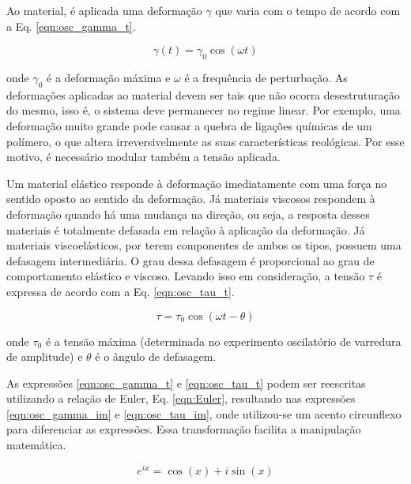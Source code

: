 			Ao material, é aplicada uma deformação \(\gamma\) que varia com o tempo de acordo com a Eq. \ref{eqn:osc_gamma_t}.
			
			\begin{equation}
				\gamma(t)=\gamma_0\cos(\omega t)
				\label{eqn:osc_gamma_t}
			\end{equation}
			
			\noindent onde \(\gamma_0\) é a deformação máxima e \(\omega\) é a frequência de perturbação. As deformações aplicadas ao material devem ser tais que não ocorra desestruturação do mesmo, isso é, o sistema deve permanecer no regime linear. Por exemplo, uma deformação muito grande pode causar a quebra de ligações químicas de um polímero, o que altera irreversivelmente as suas características reológicas. Por esse motivo, é necessário modular também a tensão aplicada.
			
			Um material elástico responde à deformação imediatamente com uma força no sentido oposto ao sentido da deformação. Já materiais viscosos respondem à deformação quando há uma mudança na direção, ou seja, a resposta desses materiais é totalmente defasada em relação à aplicação da deformação. Já materiais viscoelásticos, por terem componentes de ambos os tipos, possuem uma defasagem intermediária. O grau dessa defasagem é proporcional ao grau de comportamento elástico e viscoso. Levando isso em consideração, a tensão \(\tau\)  é expressa de acordo com a Eq. \ref{eqn:osc_tau_t}.
			
			\begin{equation}
				\tau = \tau_0\cos(\omega t - \theta)
				\label{eqn:osc_tau_t}
			\end{equation} 
			
			\noindent onde \(\tau_0\) é a tensão máxima (determinada no experimento oscilatório de varredura de amplitude) e \(\theta\) é o ângulo de defasagem.
			
			As expressões \ref{eqn:osc_gamma_t} e \ref{eqn:osc_tau_t} podem ser reescritas utilizando a relação de Euler, Eq. \ref{eqn:Euler}, resultando nas expressões \ref{eqn:osc_gamma_im} e \ref{eqn:osc_tau_im}, onde utilizou-se um acento circunflexo para diferenciar as expressões. Essa transformação facilita a manipulação matemática.
			
			\begin{equation}
				e^{ix} = \cos(x) + i\sin(x)
				\label{eqn:Euler}
			\end{equation} %
			
